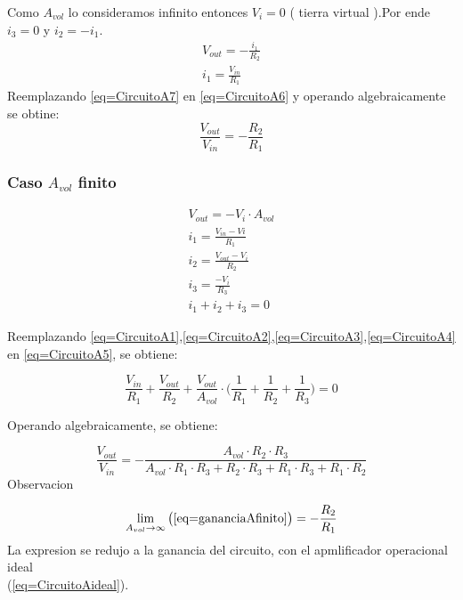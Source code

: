 \documentclass[../../main.tex]{subfiles}
\begin{document}
Como $A_{vol}$ lo consideramos infinito entonces $V_{i}=0$ \big( tierra virtual \big).Por ende $i_{3}=0$ y $i_{2}=-i_{1}$.
\begin{gather}
V_{out}=-\frac{i_{1}}{R_{2}}\label{eq=CircuitoA6}\\
i_{1}=\frac{V_{in}}{R_{1}}\label{eq=CircuitoA7}
\end{gather}
Reemplazando \ref{eq=CircuitoA7} en \ref{eq=CircuitoA6} y operando algebraicamente se obtine:
\begin{equation}
\frac{V_{out}}{V_{in}}= -\frac{R_{2}}{R_{1}} \label{eq=CircuitoAideal}
\end{equation}


\subsubsection{Caso $A_{vol}$ finito}


\begin{gather}
V_{out}= -V_{i}\cdot A_{vol}\label{eq=CircuitoA1}\\
i_{1}=\frac{V_{in}-V{i}}{R_{1}}\label{eq=CircuitoA2}\\
i_{2}=\frac{V_{out}-V_{i}}{R_{2}}\label{eq=CircuitoA3}\\
i_{3}=\frac{-V_{i}}{R_{3}}\label{eq=CircuitoA4}\\
i_{1}+i_{2}+i_{3}=0\label{eq=CircuitoA5}
\end{gather}

Reemplazando \ref{eq=CircuitoA1},\ref{eq=CircuitoA2},\ref{eq=CircuitoA3},\ref{eq=CircuitoA4} en \ref{eq=CircuitoA5}, se obtiene:


$$\frac{V_{in}}{R_{1}} + \frac{V_{out}}{R_{2}}+\frac{V_{out}}{A_{vol}}\cdot \bigg( \frac{1}{R_{1}} + \frac{1}{R_{2}} + \frac{1}{R_{3}} \bigg) = 0$$

Operando algebraicamente, se obtiene:

\begin{equation}
\frac{V_{out}}{V_{in}}= - \frac{A_{vol} \cdot R_{2} \cdot R_{3}}{A_{vol}\cdot R_{1} \cdot R_{3} + R_{2} \cdot R_{3} +  R_{1} \cdot R_{3} + R_{1} \cdot R_{2} }\label{eq=gananciaAfinito}
\end{equation}
Observacion

$$ \lim_{A_{vol}\to\infty} \big( \ref{eq=gananciaAfinito} \big) = -\frac{R_{2}}{R_{1}} $$
La expresion se redujo a la ganancia del circuito, con el apmlificador operacional ideal\\ \big(\ref{eq=CircuitoAideal}\big).



 
\end{document}
